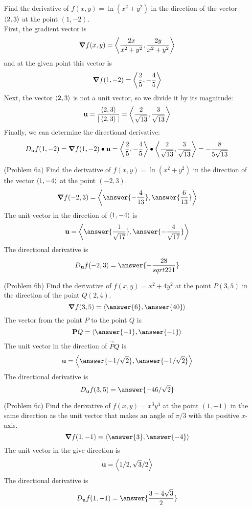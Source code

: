 \documentclass[handout]{ximera}
\begin{document}
\begin{example}[Example 6]
Find the derivative of $f(x,y) = \ln(x^2 + y^2)$ in the direction of the vector $\left\langle 2, 3\right\rangle$ at the point $(1, -2)$.\\
First, the gradient vector is
\[
\boldsymbol\nabla f(x,y) = \left\langle \frac{2x}{x^2 +y^2}, \frac{2y}{x^2 +y^2}\right\rangle
\]
and at the given point this vector is
\[
\boldsymbol\nabla f(1,-2) = \left\langle \frac{2}{5}, -\frac{4}{5}\right\rangle
\]
Next, the vector $\left\langle 2, 3\right\rangle$ is not a unit vector, so we divide it by its magnitude:
\[
\mathbf u = \frac{\left\langle 2, 3\right\rangle}{|\left\langle 2, 3\right\rangle|} = \left\langle \frac{2}{\sqrt{13}}, \frac{3}{\sqrt{13}}\right\rangle
\]
Finally, we can determine the directional derivative:
\[
D_{\mathbf u} f(1, -2) = \boldsymbol\nabla f(1,-2) \bullet \mathbf u = \left\langle \frac{2}{5}, -\frac{4}{5}\right\rangle \bullet \left\langle \frac{2}{\sqrt{13}}, \frac{3}{\sqrt{13}}\right\rangle = -\frac{8}{5\sqrt{13}}
\]
\end{example}

\begin{problem}(Problem 6a)
Find the derivative of $f(x,y) = \ln(x^2 + y^2)$ in the direction of the vector $\left\langle 1, -4\right\rangle$ at the point $(-2, 3)$.\\
\[
\grad f(-2, 3) = \vector{\answer{-\frac{4}{13}}, \answer{\frac{6}{13}}}
\]
The unit vector in the direction of $\left\langle 1, -4\right\rangle$ is
\[
\vec u =  \vector{\answer{\frac{1}{\sqrt{17}}}, \answer{-\frac{4}{\sqrt{17}}}}
\]
The directional derivative is
\[
D_{\vec u} f(-2, 3) = \answer{-\frac{28}{sqrt{221}}}
\]
\end{problem}

\begin{problem}(Problem 6b)
Find the derivative of $f(x,y) = x^2 + 4y^2$ at the point $P(3, 5)$ in the direction of the point $Q(2,4)$.\\
\[
\grad f(3, 5) = \vector{\answer{6}, \answer{40}}
\]
The vector from the point $P$ to the point $Q$ is
\[
\vec PQ = \vector{\answer{-1}, \answer{-1}}
\]
The unit vector in the direction of $\vec PQ$ is
\[
\vec u = \vector{\answer{-1/\sqrt 2}, \answer{-1/\sqrt 2}}
\]
The directional derivative is
\[
D_{\vec u} f(3, 5) = \answer{-46/\sqrt 2}
\]

\end{problem}

\begin{problem}(Problem 6c)
Find the derivative of $f(x,y) = x^3 y^4$ at the point $(1,-1)$ in the same direction as the 
unit vector that makes an angle of $\pi/3$ with the positive $x$-axis.\\
\[
\grad f(1, -1) = \vector{\answer{3}, \answer{-4}}
\]
The unit vector in the give direction is
\[
\mathbf u = \left\langle 1/2, \sqrt{3} /2\right\rangle
\]
The directional derivative is
\[
D_{\vec u} f(1, -1) = \answer{\frac{3-4\sqrt 3}{2}}
\]
\end{problem}
\end{document}

